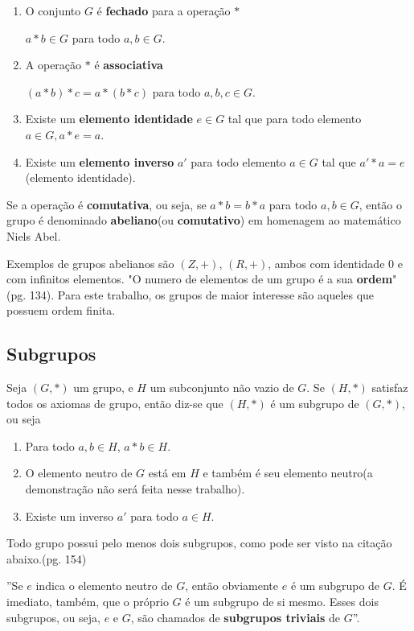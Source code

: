 \begin{enumerate}
\item O conjunto \(G\) é \textbf{fechado} para a operação \(*\)

$a * b \in G$ para todo $a,b \in G$.

\item A operação $*$ é \textbf{associativa}

$(a * b) * c = a * (b * c)$ para todo $a,b,c \in G$.

\item Existe um \textbf{elemento identidade} $e \in G$ tal que para todo elemento $a \in G, a * e = a$.
\item Existe um \textbf{elemento inverso} $a'$ para todo elemento $a \in G$ tal que $a' * a = e$ (elemento identidade).
\end{enumerate}

Se a operação é \textbf{comutativa}, ou seja, se $a * b = b * a$ para todo $a, b \in G$, então o grupo é denominado \textbf{abeliano}(ou \textbf{comutativo}) em homenagem ao matemático Niels Abel.\cite{Gilbert:2004}

Exemplos de grupos abelianos são $(Z, +)$, $(R, +)$, ambos com identidade 0 e com infinitos elementos. "O numero de elementos de um grupo é a sua \textbf{ordem}"\cite{Coutinho:2014}(pg. 134). Para este trabalho, os grupos de maior interesse são aqueles que possuem ordem finita.

\subsection{Subgrupos}
Seja $(G,*)$ um grupo, e $H$ um subconjunto não vazio de $G$. Se $(H,*)$ satisfaz todos os axiomas de grupo, então diz-se que $(H, *)$ é um subgrupo de $(G, *)$\cite{Coutinho:2014}, ou seja

\begin{enumerate}
\item Para todo $a, b \in H$, $a * b \in H$.
\item O elemento neutro de $G$ está em $H$ e também é seu elemento neutro(a demonstração não será feita nesse trabalho).
\item Existe um inverso $a'$ para todo $a \in H$.
\end{enumerate}

Todo grupo possui pelo menos dois subgrupos, como pode ser visto na citação abaixo.\cite{Domingues:2003}(pg. 154)


\begin{citacao}
''Se $e$ indica o elemento neutro de $G$, então obviamente ${e}$ é um subgrupo de $G$. É imediato, também, que o próprio $G$ é um subgrupo de si mesmo. Esses dois subgrupos, ou seja, ${e}$ e $G$, são chamados de \textbf{subgrupos triviais} de $G$''.
\end{citacao}

